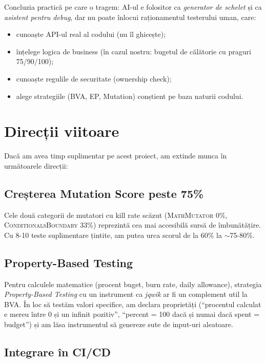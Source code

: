 Concluzia practică pe care o tragem: AI-ul e folositor ca \textit{generator de schelet} și ca \textit{asistent pentru debug}, dar nu poate înlocui raționamentul testerului uman, care:

\begin{itemize}
    \item cunoaște API-ul real al codului (nu îl ghicește);
    \item înțelege logica de business (în cazul nostru: bugetul de călătorie cu praguri 75/90/100);
    \item cunoaște regulile de securitate (ownership check);
    \item alege strategiile (BVA, EP, Mutation) conștient pe baza naturii codului.
\end{itemize}

\section{Direcții viitoare}

Dacă am avea timp suplimentar pe acest proiect, am extinde munca în următoarele direcții:

\subsection{Creșterea Mutation Score peste 75\%}

Cele două categorii de mutatori cu kill rate scăzut (\textsc{MathMutator} 0\%, \textsc{ConditionalsBoundary} 33\%) reprezintă cea mai accesibilă sursă de îmbunătățire. Cu 8-10 teste suplimentare țintite, am putea urca scorul de la 60\% la $\sim$75-80\%.

\subsection{Property-Based Testing}

Pentru calculele matematice (procent buget, burn rate, daily allowance), strategia \textit{Property-Based Testing} cu un instrument ca \textit{jqwik} \cite{jqwik_docs} ar fi un complement util la BVA. În loc să testăm valori specifice, am declara proprietăți (\enquote{procentul calculat e mereu între 0 și un infinit pozitiv}, \enquote{percent = 100 dacă și numai dacă spent = budget}) și am lăsa instrumentul să genereze sute de input-uri aleatoare.

\subsection{Integrare în CI/CD}

